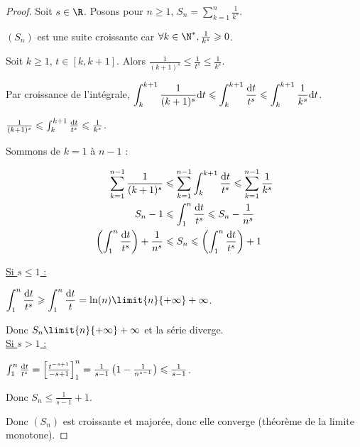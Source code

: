 
\begin{proof}
    Soit $s \in \R$. 
    Posons pour $\displaystyle n \geqslant 1, \, S_n = \sum_{k = 1 }^{n} \frac{1}{k^s}$.

    $(S_n)$ est une suite croissante car $\forall k \in \N^*, \frac 1 {k^s} \geqslant 0$. 

    Soit $k \geqslant 1, \, t \in [k, k+1]$. Alors $\frac 1 {(k + 1)^s} \leqslant \frac 1 {t^s} \leqslant \frac 1 {k^s}$.

    \svspace Par croissance de l'intégrale, $\displaystyle \int_{k }^{k + 1} \frac 1 {(k + 1)^s} \text d t \leqslant \int_{k }^{k + 1} \frac{\text d t}{t^s} \leqslant \int_{k }^{k + 1} \frac 1 {k^s} \text d t$.

    $\frac 1 {(k + 1)^s} \leqslant \int_{k }^{k + 1} \frac{\text d t}{t^s} \leqslant \frac 1 {k^s}$.

    Sommons de $k = 1$ à $n - 1$ : 

    \begin{align*}
        \sum_{k = 1}^{n - 1} \frac 1 {(k + 1)^s} & \leqslant \sum_{k = 1}^{n - 1} \int_{k }^{k + 1} \frac{\text d t}{t^s} \leqslant \sum_{k = 1}^{n - 1} \frac 1 {k^s} \\
        S_n - 1 & \leqslant \int_{1 }^{n } \frac{\text d t}{t^s} \leqslant S_n  - \frac 1 {n^s} \\
        \left( \int_{1}^{n } \frac{\text d t}{t^s} \right) + \frac 1 {n^s} & \leqslant S_n \leqslant \left( \int_{1 }^{n } \frac{\text d t}{t^s} \right) + 1
    \end{align*}

    \uline{Si $s \leqslant 1$ :}

    \avspace $\displaystyle \int_{1 }^{n} \frac{\text d t}{t^s}  \geqslant \int_{1 }^{n } \frac{\text d t}{t} = \ln(n) \limit{n}{+ \infty} +\infty$.

    Donc $S_n \limit{n}{+ \infty} +\infty$ et la série diverge. \\

    \uline{Si $s > 1$ :}

    \svspace $\int_{1 }^{n} \frac{\text d t}{t^s}  = \left[ \frac{t^{-s + 1}}{-s + 1} \right]_{1}^{n} = \frac 1 {s - 1} \left( 1 - \frac 1 {n^{s - 1}} \right) \leqslant \frac 1 {s - 1}$.

    Donc $S_n \leqslant \frac 1 {s - 1} + 1$.

    Donc $(S_n)$ est croissante et majorée, donc elle converge (théorème de la limite monotone).
\end{proof}


